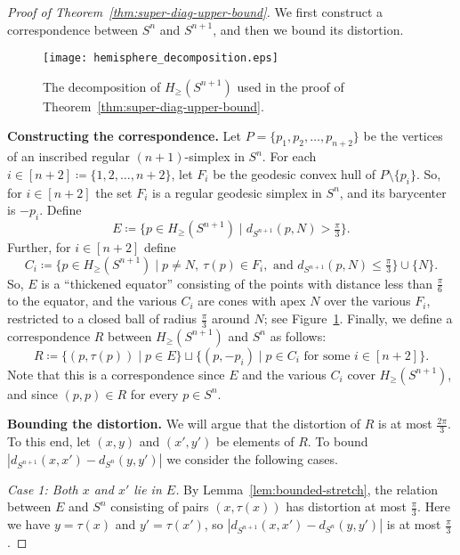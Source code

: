 \documentclass[11pt, reqno, english]{amsart}
\begin{document}
\begin{proof}[Proof of Theorem~\ref{thm:super-diag-upper-bound}]
We first construct a correspondence between $S^n$ and $S^{n+1}$, and then we bound its distortion.

\begin{figure}[h]
\centering
\texttt{[image: hemisphere\_decomposition.eps]}
\caption{The decomposition of $H_\ge(S^{n+1})$ used in the proof of Theorem~\ref{thm:super-diag-upper-bound}.}
\label{fig:hemisphere_decomposition}
\end{figure}

\vspace{1mm}\noindent\textbf{Constructing the correspondence.}
Let $P = \{p_1, p_2, \ldots, p_{n+2}\}$ be the vertices of an inscribed regular $(n+1)$-simplex in $S^n$.
For each $i\in[n+2]\coloneqq\{1,2,\ldots,n+2\}$, let $F_i$ be the geodesic convex hull of $P\setminus \{p_i\}$.
So, for $i\in[n+2]$ the set $F_i$ is a regular geodesic simplex in $S^n$, and its barycenter is $-p_i$.
Define
\[
E \coloneqq \{p\in H_{\ge}(S^{n+1}) \mid d_{S^{n+1}}(p, N) > \tfrac{\pi}{3}\}.
\]
Further, for $i\in[n+2]$ define
\[
C_i \coloneqq \{p\in H_{\ge}(S^{n+1}) \mid p\neq N,\ \tau(p) \in F_i, \text{ and } d_{S^{n+1}}(p,N) \le \tfrac{\pi}{3}\} \cup \{N\}.
\]
So, $E$ is a ``thickened equator'' consisting of the points with distance less than $\tfrac{\pi}{6}$ to the equator, and the various $C_i$ are cones with apex $N$ over the various $F_i$, restricted to a closed ball of radius $\tfrac{\pi}{3}$ around $N$; see Figure~\ref{fig:hemisphere_decomposition}.
Finally, we define a correspondence $R$ between $H_\ge(S^{n+1})$ and $S^n$ as follows:
\[
R \coloneqq  \{(p, \tau(p)) \mid p\in E\} \sqcup \{ (p, -p_i) \mid p\in C_i \text{ for some } i\in[n+2]\}.
\]
Note that this is a correspondence since $E$ and the various $C_i$ cover $H_{\ge}(S^{n+1})$, and since $(p,p)\in R$ for every $p\in S^n$.

\vspace{1mm}\noindent\noindent\textbf{Bounding the distortion.}
We will argue that the distortion of $R$ is at most $\tfrac{2\pi}{3}$.
To this end, let $(x,y)$ and $(x',y')$ be elements of $R$.
To bound $|d_{S^{n+1}}(x,x') - d_{S^{n}}(y,y')|$ we consider the following cases.\smallskip

\noindent \emph{Case 1: Both $x$ and $x'$ lie in $E$.}
By Lemma~\ref{lem:bounded-stretch}, the relation between $E$ and $S^n$ consisting of pairs $(x,\tau(x))$ has distortion at most $\tfrac{\pi}{3}$.
Here we have $y = \tau(x)$ and $y' = \tau(x')$, so $|d_{S^{n+1}}(x,x') - d_{S^{n}}(y,y')|$ is at most $\tfrac{\pi}{3}$.
\smallskip


\end{proof}
\end{document}
